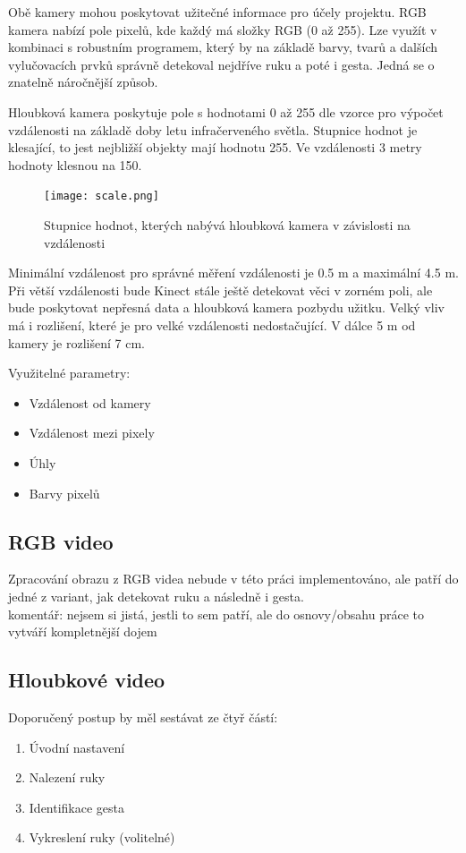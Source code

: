 Obě kamery mohou poskytovat užitečné informace pro účely projektu. RGB kamera nabízí pole pixelů, kde každý má složky RGB (0 až 255). Lze využít v kombinaci s robustním programem, který by na základě barvy, tvarů a dalších vylučovacích prvků správně detekoval nejdříve ruku a poté i gesta. Jedná se o znatelně náročnější způsob.

Hloubková kamera poskytuje pole s hodnotami 0 až 255 dle vzorce pro výpočet vzdálenosti na základě doby letu infračerveného světla. Stupnice hodnot je klesající, to jest nejbližší objekty mají hodnotu 255. Ve vzdálenosti 3 metry hodnoty klesnou na 150. 

\begin{figure}[htp]
\centering
\texttt{[image: scale.png]}
\caption{Stupnice hodnot, kterých nabývá hloubková kamera v závislosti na vzdálenosti}
\label{fig:scale}
\end{figure}

Minimální vzdálenost pro správné měření vzdálenosti je 0.5 m a maximální 4.5 m. Při větší vzdálenosti bude Kinect stále ještě detekovat věci v zorném poli, ale bude poskytovat nepřesná data a hloubková kamera pozbydu užitku. Velký vliv má i rozlišení, které je pro velké vzdálenosti nedostačující. V dálce 5 m od kamery je rozlišení 7 cm.

Využitelné parametry:

\begin{itemize}
\item Vzdálenost od kamery
\item Vzdálenost mezi pixely
\item Úhly
\item Barvy pixelů
\end{itemize}

\subsection{RGB video}
Zpracování obrazu z RGB videa nebude v této práci implementováno, ale patří do jedné z variant, jak detekovat ruku a následně i gesta.\\
komentář: nejsem si jistá, jestli to sem patří, ale do osnovy/obsahu práce to vytváří kompletnější dojem

\subsection{Hloubkové video}
Doporučený postup by měl sestávat ze čtyř částí:

\begin{enumerate}
\item Úvodní nastavení
\item Nalezení ruky
\item Identifikace gesta
\item Vykreslení ruky (volitelné)
\end{enumerate}

